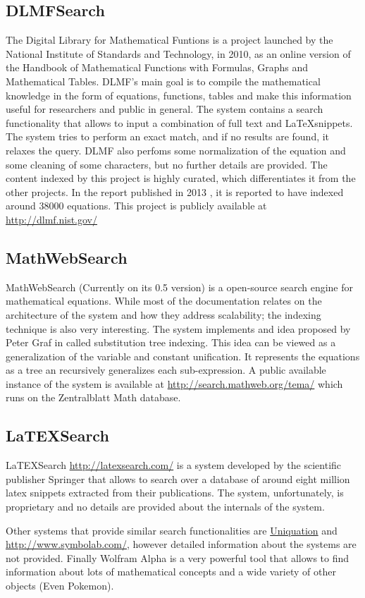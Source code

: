 \subsection{DLMFSearch}
The Digital Library for Mathematical Funtions \cite{dlmf} is a project launched by the National Institute of Standards and Technology, in 2010, as an online version of the  Handbook of Mathematical Functions with Formulas, Graphs and Mathematical Tables\cite{handbook}. DLMF's main goal is to compile the mathematical knowledge in the form of equations, functions, tables and make this information useful for researchers and public in general. The system contains a search functionality that allows to input a combination of full text and \LaTeX snippets. The system tries to perform an exact match, and if no results are found, it relaxes the query. DLMF also perfoms some normalization of the equation and some cleaning of some characters, but no further details are provided. The content indexed by this project is highly curated, which differentiates it from the other projects. In the report published in 2013 \cite{dlmf2}, it is reported to have indexed around 38000 equations. This project is publicly available at \url{http://dlmf.nist.gov/}

\subsection{MathWebSearch}
MathWebSearch\cite{mathwebsearch} (Currently on its 0.5 version) is a open-source search engine for mathematical equations. While most of the documentation relates on the architecture of the system and how they address scalability; the indexing technique is also very interesting. The system implements and idea proposed by Peter Graf in \cite{substitution_tree_indexing} called substitution tree indexing. This idea can be viewed as a generalization of the variable and constant unification. It represents the equations as a tree an recursively generalizes each sub-expression. A public available instance of the system is available at \url{http://search.mathweb.org/tema/} which runs on the Zentralblatt Math database\cite{zb}.


\subsection{LaTEXSearch}
LaTEXSearch \url{http://latexsearch.com/} is a system developed by the scientific publisher Springer that allows to search over a database of around eight million latex snippets extracted from their publications. The system, unfortunately, is proprietary and no details are provided about the internals of the system.

Other systems that provide similar search functionalities are \url{Uniquation} and \url{http://www.symbolab.com/}, however detailed information about the systems are not provided. Finally Wolfram Alpha\cite{wolframalpha} is a very powerful tool that allows to find information about lots of mathematical concepts and a wide variety of other objects (Even Pokemon).
